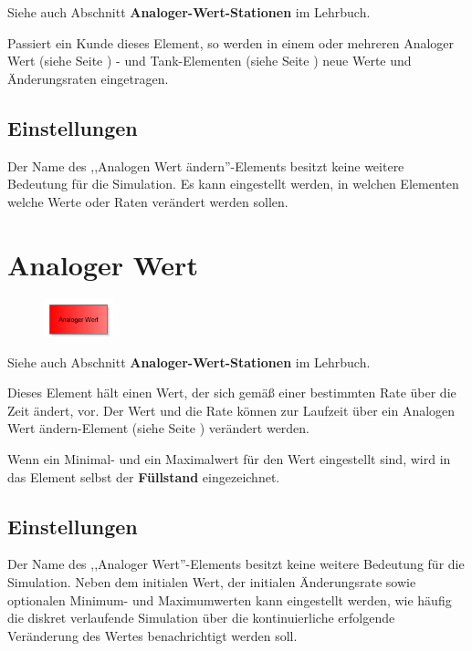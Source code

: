Siehe auch Abschnitt \textbf{Analoger-Wert-Stationen} im Lehrbuch.

Passiert ein Kunde dieses Element, so werden in einem oder mehreren
Analoger Wert (siehe Seite \pageref{ref:ModelElementAnalogValue}) - und
Tank-Elementen (siehe Seite \pageref{ref:ModelElementTank}) 
neue Werte und Änderungsraten eingetragen.

\subsection*{Einstellungen}

Der Name des ,,Analogen Wert ändern''-Elements besitzt keine weitere Bedeutung für die Simulation.
Es kann eingestellt werden, in welchen Elementen welche Werte oder Raten verändert werden sollen.


\section{Analoger Wert}
\label{ref:ModelElementAnalogValue}

\begin{figure}
\vspace{-22pt}
\includegraphics[width=2cm]{imageModelElementAnalogValue.png}
\vspace{-22pt}
\end{figure}

Siehe auch Abschnitt \textbf{Analoger-Wert-Stationen} im Lehrbuch.

Dieses Element hält einen Wert, der sich gemäß einer bestimmten Rate über die Zeit ändert, vor.
Der Wert und die Rate können zur Laufzeit über ein
Analogen Wert ändern-Element (siehe Seite \pageref{ref:ModelElementAnalogAssign}) verändert werden.

Wenn ein Minimal- und ein Maximalwert für den Wert eingestellt sind, wird in das Element
selbst der \textbf{Füllstand} eingezeichnet.

\subsection*{Einstellungen}

Der Name des ,,Analoger Wert''-Elements besitzt keine weitere Bedeutung für die Simulation.
Neben dem initialen Wert, der initialen Änderungsrate sowie optionalen Minimum- und Maximumwerten
kann eingestellt werden, wie häufig die diskret verlaufende Simulation über die kontinuierliche
erfolgende Veränderung des Wertes benachrichtigt werden soll.


